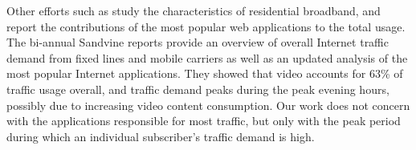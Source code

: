 Other efforts such as \cite{maier-imc2012, grover-imc2013} study the characteristics of 
residential broadband, and report the contributions of the most popular 
web applications to the total usage.
The bi-annual Sandvine reports \cite{sandvine20141h, 
sandvine20142h} provide an overview of overall Internet traffic 
demand from fixed lines and mobile carriers as well as an updated analysis of 
the most popular Internet applications. They showed that video accounts for 63\%
of traffic usage overall, and traffic demand peaks during the peak evening 
hours, possibly due to increasing video content consumption. Our work does not 
concern with the applications responsible for most traffic, but only with the 
peak period during which an individual subscriber's traffic demand is high.